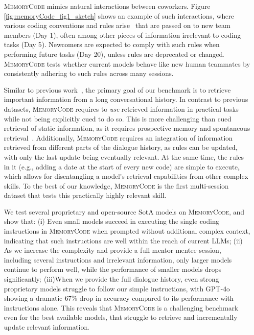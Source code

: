 \textsc{MemoryCode} mimics natural interactions between coworkers. Figure \ref{fig:memoryCode_fig1_sketch} shows an example of such interactions, where various coding conventions and rules arise~\cite{convertino2008articulating,chumg2022drives} that are passed on to new team members (Day 1), often among other pieces of information irrelevant to coding tasks (Day 5). Newcomers are expected to comply with such rules when performing future tasks (Day 20), unless rules are deprecated or changed.
\textsc{MemoryCode} tests whether current models behave like new human teammates by consistently adhering to such rules across many sessions.


Similar to previous work~\cite{nelson2024needle,epstein2024mmmt,maharana-etal-2024-evaluating}, the primary goal of our benchmark is to retrieve important information from a long conversational history.  
In contrast to previous datasets, \textsc{MemoryCode} requires to \emph{use} retrieved information in practical tasks while not being explicitly cued to do so.
This is more challenging than cued retrieval of static information, as it requires prospective 
memory and spontaneous retrieval~\cite{mcdaniel2007prospective,brandimonte2014prospective}. 
Additionally, \textsc{MemoryCode} requires an integration of information retrieved from different parts of the dialogue history, as rules can be updated, with only the last update being eventually relevant.
At the same time, the rules in it (e.g., adding a date at the start of every new code) are simple to execute, which allows for disentangling a model's retrieval capabilities from other complex skills.
To the best of our knowledge, \textsc{MemoryCode} is the first multi-session dataset that tests this practically highly relevant skill.

We test several proprietary and open-source
SotA models on \textsc{MemoryCode}, and show that:
(i) Even small models succeed in executing the single coding instructions in \textsc{MemoryCode} when prompted without additional complex context, indicating that such instructions are well within the reach of current LLMs;
(ii) As we increase the complexity and provide a full mentor-mentee session, including several instructions and irrelevant information, 
only larger models continue to perform well, while the performance of smaller models drops significantly;
(iii)When we provide the full dialogue history, even strong proprietary models struggle to follow our simple instructions, with GPT-4o showing a dramatic 67\% drop in accuracy compared to its performance with instructions alone. This reveals that \textsc{MemoryCode} is a challenging benchmark even for the best available models, that struggle to retrieve and incrementally update relevant information.




